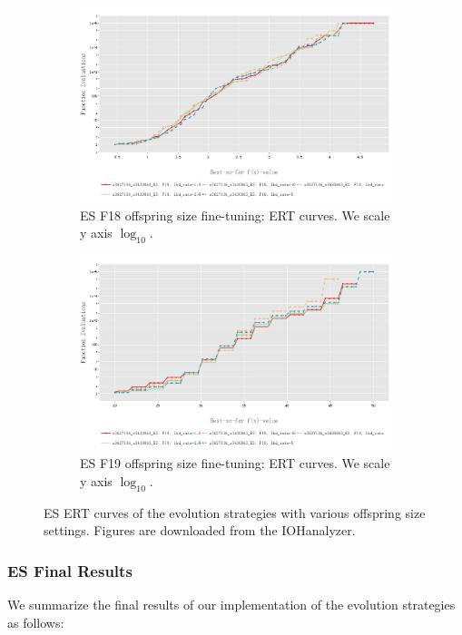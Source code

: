 \documentclass{article}
\begin{document}
\begin{figure}[!ht]
    \begin{subfigure}[h]{0.95\linewidth}
        \includegraphics[width=\linewidth]{es/f18/ERT18lbd.png}
        \caption{ES F18 offspring size fine-tuning: ERT curves. We scale y axis $\log_{10}$.}
    \end{subfigure}
    \hfill
    \begin{subfigure}[h]{0.95\linewidth}
        \includegraphics[width=\linewidth]{es/f19/ERT19lbd.png}
        \caption{ES F19 offspring size fine-tuning: ERT curves. We scale y axis $\log_{10}$.}
    \end{subfigure}
    \caption{ES ERT curves of the evolution strategies with various offspring size settings. Figures are downloaded from the IOHanalyzer.}
    \label{fig:experi-es-osize-ert}
\end{figure}

\subsubsection{ES Final Results}
We summarize the final results of our implementation of the evolution strategies as follows:
\end{document}
